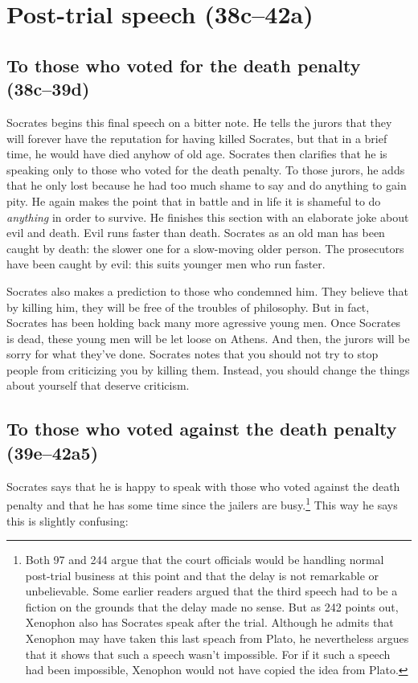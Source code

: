 \documentclass[11pt]{article}
\begin{document}

\section{Post-trial speech (38c--42a)}

\subsection{To those who voted for the death penalty (38c--39d)}

Socrates begins this final speech on a bitter note.  He tells the jurors
that they will forever have the reputation for having killed Socrates, but
that in a brief time, he would have died anyhow of old age.  Socrates then
clarifies that he is speaking only to those who voted for the death
penalty.  To those jurors, he adds that he only lost because he had too
much shame to say and do anything to gain pity.  He again makes the point
that in battle and in life it is shameful to do \emph{anything} in order to
survive.  He finishes this section with an elaborate joke about evil and
death. Evil runs faster than death.  Socrates as an old man has been caught
by death: the slower one for a slow-moving older person.  The prosecutors
have been caught by evil: this suits younger men who run faster.

Socrates also makes a prediction to those who condemned him.  They believe
that by killing him, they will be free of the troubles of philosophy.  But
in fact, Socrates has been holding back many more agressive young men.
Once Socrates is dead, these young men will be let loose on Athens.  And
then, the jurors will be sorry for what they've done.  Socrates notes that
you should not try to stop people from criticizing you by killing them.
Instead, you should change the things about yourself that deserve
criticism.


\subsection{To those who voted against the death penalty (39e--42a5)}

Socrates says that he is happy to speak with those who voted against the
death penalty and that he has some time since the jailers are
busy.\footnote{Both \citet{adam1914} 97 and \citet{burnet1924} 244 argue
that the court officials would be handling normal post-trial business
at this point and that the delay is not remarkable or unbelievable.
Some earlier readers argued that the third speech had to be a fiction
on the grounds that the delay made no sense.  But as \citet{burnet1924}
242 points out, Xenophon also has Socrates speak after the trial.
Although he admits that Xenophon may have taken this last speach from
Plato, he nevertheless argues that it shows that such a speech wasn't
impossible.  For if it such a speech had been impossible, Xenophon would
not have copied the idea from Plato.}  This way he says this is slightly
confusing:
\end{document}
